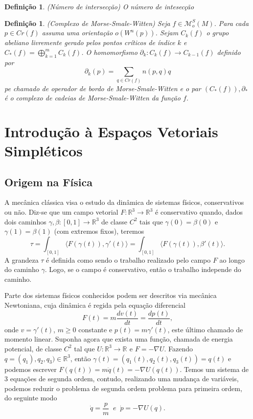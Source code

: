 \documentclass[12pt]{book}
\newtheorem{definicao}[teorema]{Definição}
\newcommand{\derivada}[2]{\frac{d #1}{d #2}}
\newcommand{\funcoesmorsesmale}[1]{\mathcal{M}^{S}_{o}(#1)}
\newcommand{\intervalo}{[0,1]}
\newcommand{\pontoscriticos}[1]{\textit{Cr}(#1)}
\newcommand{\produtointerno}[2]{\langle #1, #2 \rangle}
\newcommand{\real}[1]{\mathbb{R}^{#1}}
\newcommand{\reta}{\real{}}
\newcommand{\variedadeinstavel}[1]{W^{u}(#1)}
\begin{document}
	\begin{definicao}
		(Número de intersecção) O número de intesecção 
	\end{definicao}
	
	\begin{definicao}
		(Complexo de Morse-Smale-Witten) Seja $f \in \funcoesmorsesmale{M}$. Para cada $p \in \pontoscriticos{f}$ assuma uma orientação $o(\variedadeinstavel{p})$. Sejam $C_{k}(f)$ o grupo abeliano livremente gerado pelos pontos críticos de índice $k$ e $C_{*}(f) =\bigoplus^{m}_{k=1}C_{k}(f)$. O homomorfismo $\partial_{k}: C_{k}(f)\to C_{k-1}(f)$ definido por 
		$$
		\partial_{k}(p)=\sum_{q \in \pontoscriticos{f}}n(p,q)q
		$$
		pe chamado de operador de bordo de Morse-Smale-Witten e o par $(C_{*}(f)), \partial_{*}$ é o complexo de cadeias de Morse-Smale-Witten  da função $f$.
		
	\end{definicao}
	
	\chapter{Introdução à Espaços Vetoriais Simpléticos}
	
	\section{Origem na Física}
	
	A mecânica clássica visa o estudo da dinâmica de sistemas físicos, conservativos ou não. Diz-se que um campo vetorial $F:\real{3} \to \real{3}$ é conservativo quando, dados dois caminhos $\gamma,\beta:[0,1] \to \real{3}$ de classe $C^{2}$ tais que $\gamma(0)=\beta(0)$ e $\gamma(1)=\beta(1)$ (com extremos fixos), teremos
	$$
	\tau=\int_{\intervalo} \produtointerno{F(\gamma(t))}{\gamma'(t)}=
	\int_{\intervalo} \produtointerno{F(\gamma(t))}{\beta'(t)}.
	$$
	A grandeza $\tau$ é definida como sendo o trabalho realizado pelo campo $F$ ao longo do caminho $\gamma$. Logo, se o campo é conservativo, então o trabalho independe do caminho.
	
	Parte dos sistemas físicos conhecidos podem ser descritos via mecânica Newtoniana, cuja dinâmica é regida pela equação diferencial 
	$$
	F(t) = m\derivada{v(t)}{t} = \derivada{p(t)}{t},
	$$
	onde $v = \gamma'(t)$, $m\geq0$ constante e $p(t) = m\gamma'(t)$, este último chamado de momento linear. Suponha agora que exista uma função, chamada de energia potencial, de classe $C^{2}$ tal que $U:\real{3}\to \reta$ e $F = -\nabla U$. Fazendo $q=(q_{1}),q_{2}, q_{3})\in \real{3}$, então $\gamma(t)=(q_{1}(t),q_{2}(t), q_{3}(t)) = q(t)$ e podemos escrever $F(q(t)) =m \ddot{q}(t)= -\nabla U(q(t))$. Temos um sistema de 3 equações de segunda ordem, contudo, realizando uma mudança de variáveis, podemos reduzir o problema de segunda ordem problema para primeira ordem, do seguinte modo
	$$
	\dot{q} = \frac{p}{m} \;\; e \;\;\dot{p} = -\nabla U(q).
	$$
	
\end{document}
